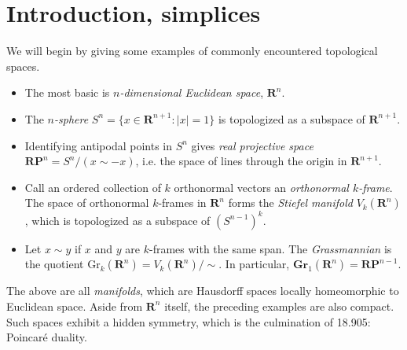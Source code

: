
\section{Introduction, simplices}\label{905}
We will begin by giving some examples of commonly encountered topological
spaces.
\begin{itemize}
    \item The most basic is \emph{$n$-dimensional Euclidean space}, $\mathbf{R}^n$.
    \item The \emph{$n$-sphere} $S^n=\{x\in \mathbf{R}^{n+1}:|x|=1\}$ is topologized as a subspace of $\mathbf{R}^{n+1}$.
    \item Identifying antipodal points in $S^n$ gives \emph{real projective space} $\mathbf{RP}^n=S^n / (x\sim -x)$, i.e. the space of lines through the origin in $\mathbf{R}^{n+1}$.
    \item Call an ordered collection of $k$ orthonormal vectors an \emph{orthonormal $k$-frame}. The space of orthonormal $k$-frames in $\mathbf{R}^n$ forms the \emph{Stiefel manifold} $V_k(\mathbf{R}^n)$, which is topologized as a subspace of $(S^{n-1})^k$.
    \item Let $x\sim y$ if $x$ and $y$ are $k$-frames with the same span. The \emph{Grassmannian} is the quotient $\mathrm{Gr}_k(\mathbf{R}^n)=V_k(\mathbf{R}^n)/\sim$. In particular, $\mathbf{Gr}_1(\mathbf{R}^n) = \mathbf{RP}^{n-1}$.
\end{itemize}
The above are all \emph{manifolds}, which are Hausdorff spaces locally homeomorphic to Euclidean space. Aside from $\mathbf{R}^n$ itself, the preceding examples are also compact. Such spaces exhibit a hidden symmetry, which is the culmination of 18.905: Poincar\'{e} duality.

